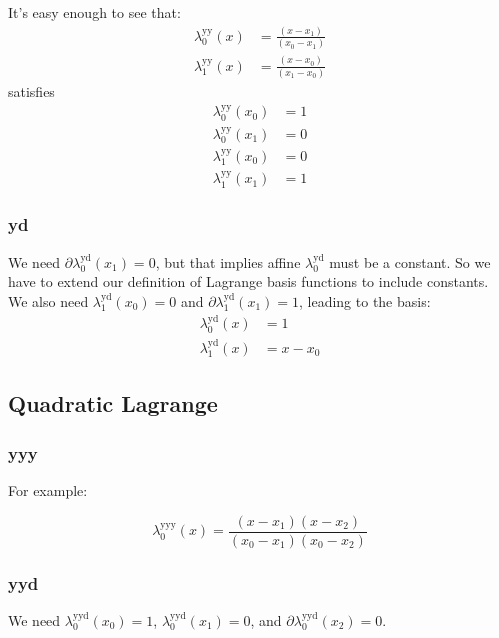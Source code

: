 It's easy enough to see that:
\begin{align}
\lambda^{\text{yy}}_0(x) & = \frac {(x - x_1)} {(x_0 - x_1)} \\
\lambda^{\text{yy}}_1(x) & = \frac {(x - x_0)} {(x_1 - x_0)} \nonumber
\end{align}
satisfies
\begin{align}
\lambda^{\text{yy}}_0(x_0) & = 1 \\
\lambda^{\text{yy}}_0(x_1) & = 0 \nonumber \\
\lambda^{\text{yy}}_1(x_0) & = 0 \nonumber \\
\lambda^{\text{yy}}_1(x_1) & = 1 \nonumber 
\end{align}


\subsubsection{yd}

We need $\partial\lambda^{\text{yd}}_0 (x_1) = 0$,
but that implies affine $\lambda^{\text{yd}}_0$ 
must be a constant.
So we have to extend our definition of Lagrange basis functions
to include constants.
We also need $\lambda^{\text{yd}}_1 (x_0) = 0$ and
$\partial\lambda^{\text{yd}}_1 (x_1) = 1$, leading to the basis:
\begin{align}
\lambda^{\text{yd}}_0 (x) & = 1 \\
\lambda^{\text{yd}}_1 (x) & = x - x_0 \nonumber
\end{align}


\subsection{Quadratic Lagrange}

\subsubsection{yyy}

For example:

\begin{equation}
\lambda^{\text{yyy}}_0(x) = 
\frac {(x - x_1) (x - x_2)} {(x_0 - x_1) (x_0 - x_2)}
\end{equation}

\subsubsection{yyd}

We need 
$\lambda^{\text{yyd}}_0(x_0) = 1$, 
$\lambda^{\text{yyd}}_0(x_1) = 0$, and
$\partial\lambda^{\text{yyd}}_0(x_2) = 0$. 

